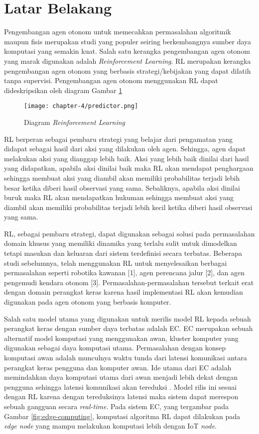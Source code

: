 \section{Latar Belakang}

Pengembangan agen otonom untuk memecahkan permasalahan algoritmik maupun fisis merupakan studi yang populer seiring berkembangnya sumber daya komputasi yang semakin kuat. Salah satu kerangka pengembangan agen otonom yang marak digunakan adalah \textit{Reinforcement Learning}. \ac{RL} merupakan kerangka pengembangan agen otonom yang berbasis strategi/kebijakan yang dapat dilatih tanpa supervisi. Pengembangan agen otonom menggunakan \ac{RL} dapat dideskripsikan oleh diagram Gambar \ref{fig:RL-diagram}

\begin{figure}[h]
	\centering
	\texttt{[image: chapter-4/predictor.png]}
	\caption{Diagram \textit{Reinforcement Learning}}
	\label{fig:RL-diagram}
\end{figure}

\ac{RL} berperan sebagai pembaru strategi yang belajar dari pengamatan yang didapat sebagai hasil dari aksi yang dilakukan oleh agen. Sehingga, agen dapat melakukan aksi yang dianggap lebih baik. Aksi yang lebih baik dinilai dari hasil yang didapatkan, apabila aksi dinilai baik maka \ac{RL} akan mendapat penghargaan sehingga membuat aksi yang diambil akan memiliki probabilitas terjadi lebih besar ketika diberi hasil observasi yang sama. Sebaliknya, apabila aksi dinilai buruk maka \ac{RL} akan mendapatkan hukuman sehingga membuat aksi yang diambil akan memiliki probabilitas terjadi lebih kecil ketika diberi hasil observasi yang sama.

\ac{RL}, sebagai pembaru strategi, dapat digunakan sebagai solusi pada permasalahan domain khusus yang memiliki dinamika yang terlalu sulit untuk dimodelkan tetapi masukan dan keluaran dari sistem terdefinisi secara terbatas. Beberapa studi sebelumnya, telah menggunakan RL untuk menyelesaikan berbagai permasalahan seperti robotika kawanan [1], agen perencana jalur [2], dan agen pengemudi kendara otonom [3]. Permasalahan-permasalahan tersebut terkait erat dengan domain perangkat keras karena hasil implementasi RL akan kemudian digunakan pada agen otonom yang berbasis komputer.

Salah satu model utama yang digunakan untuk merilis model RL kepada sebuah perangkat keras dengan sumber daya terbatas adalah \ac{EC}. \ac{EC} merupakan sebuah alternatif model komputasi yang menggunakan awan, kluster komputer yang digunakan sebagai daya komputasi utama. Permasalahan dengan konsep komputasi awan adalah munculnya waktu tunda dari latensi komunikasi antara perangkat keras pengguna dan komputer awan. Ide utama dari \ac{EC} adalah memindahkan daya komputasi utama dari awan menjadi lebih dekat dengan pengguna sehingga latensi komunikasi akan tereduksi \parencite{edgecomputing}. Model rilis ini sesuai dengan RL karena dengan tereduksinya latensi maka sistem dapat merespon sebuah gangguan secara \textit{real-time}. Pada sistem \ac{EC}, yang tergambar pada Gambar \ref{fig:edge-computing}, komputasi algoritma RL dapat dilakukan pada \textit{edge node} yang mampu melakukan komputasi lebih dengan \ac{IoT} \textit{node}.


